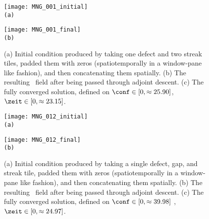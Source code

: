 \begin{description}
\begin{figure}[t]
\begin{minipage}[height=.30\textheight]{.30\textwidth}
\centering
\texttt{[image: MNG\_001\_initial]}
\\ \small{\texttt{(a)}}
\end{minipage}
\begin{minipage}[height=.30\textheight]{.30\textwidth}
\centering \small{
\texttt{[image: MNG\_001\_final]}
\\ \small{\texttt{(b)}}}
\end{minipage}
\caption{\label{f:MNGtiling001none}
(a) Initial condition produced by taking one defect and two streak tiles,
padded them with zeros (spatiotemporally in a window-pane like
fashion), and then concatenating them spatially. (b) The resulting
\spt\ field after being passed through adjoint descent. (c)
The fully converged solution, defined on $\conf \in [0,\approx 25.90
]$,$\zeit \in [0,\approx 23.15]$.
}
\end{figure}

\begin{figure}[t]
\begin{minipage}[height=.30\textheight]{.30\textwidth}
\centering
\texttt{[image: MNG\_012\_initial]}
\\ \small{\texttt{(a)}}
\end{minipage}
\begin{minipage}[height=.30\textheight]{.30\textwidth}
\centering \small{
\texttt{[image: MNG\_012\_final]}
\\ \texttt{(b)}}
\end{minipage}
\caption{\label{f:MNGtiling012none}
(a) Initial condition produced by taking a single defect, gap, and streak tile,
padded them with zeros (spatiotemporally in a window-pane like
fashion), and then concatenating them spatially. (b) The resulting
\spt\ field after being passed through adjoint descent. (c)
The fully converged solution, defined on $\conf \in [0,\approx 39.98]$
,$\zeit \in [0,\approx 24.97]$.
}
\end{figure}


\end{description}
